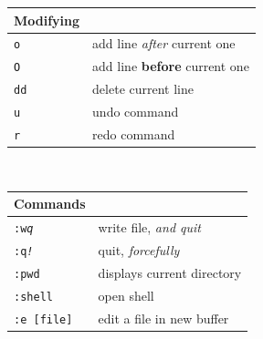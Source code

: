 \documentclass[12pt]{article}
\newcommand{\key}[1]{\large{\texttt{#1}}} %
\begin{document}
\begin{center}
  \begin{tabular}{ | p{3cm} | p{7cm} | }
    \cline{0-0}
    Modifying \\ \hline
    \key{o} & add line \textit{after} current one \\ \hline
    \key{O} & add line \textbf{before} current one \\ \hline
    \key{dd} & delete current line \\ \hline
    \key{u} & undo command \\ \hline
    \key{r} & redo command \\ \hline
  \end{tabular} \\ [1cm]
\end{center}

\begin{center}
  \begin{tabular}{ | p{3cm} | p{7cm} | }
    \cline{0-0}
    Commands \\ \hline
    \key{:w}\textit{\key{q}} & write file, \textit{and quit} \\ \hline
    \key{:q}\textit{\key{!}} & quit, \textit{forcefully} \\ \hline
    \key{:pwd} & displays current directory \\ \hline
    \key{:shell} & open shell \\ \hline
    \key{:e [file]} & edit a file in new buffer\\ \hline
  \end{tabular}
\end{center}
\end{document}

